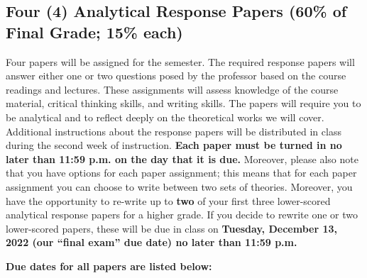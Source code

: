 \documentclass[11pt,]{article}
\begin{document}
\hypertarget{writing_assignments}{%
\subsection{Four (4) Analytical Response Papers (60\% of Final Grade;
15\% each)}\label{writing_assignments}}

Four papers will be assigned for the semester. The required response
papers will answer either one or two questions posed by the professor
based on the course readings and lectures. These assignments will assess
knowledge of the course material, critical thinking skills, and writing
skills. The papers will require you to be analytical and to reflect
deeply on the theoretical works we will cover. Additional instructions
about the response papers will be distributed in class during the second
week of instruction. \textbf{Each paper must be turned in no later than
11:59 p.m. on the day that it is due.} Moreover, please also note that
you have options for each paper assignment; this means that for each
paper assignment you can choose to write between two sets of theories.
Moreover, you have the opportunity to re-write up to \textbf{two} of
your first three lower-scored analytical response papers for a higher
grade. If you decide to rewrite one or two lower-scored papers, these
will be due in class on \textbf{Tuesday, December 13, 2022 (our ``final
exam'' due date) no later than 11:59 p.m.}

\textbf{Due dates for all papers are listed below:}

\renewcommand{\arraystretch}{1.25}
\end{document}
